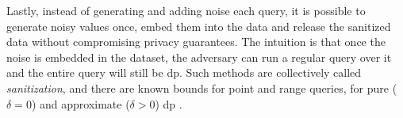 			Lastly, instead of generating and adding noise each query, it is possible to generate noisy values once, embed them into the data and release the sanitized data without compromising privacy guarantees.
			The intuition is that once the noise is embedded in the dataset, the adversary can run a regular query over it and the entire query will still be \acrshort{dp}.
			Such methods are collectively called \emph{sanitization}, and there are known bounds for point and range queries, for pure ($\delta = 0$) and approximate ($\delta > 0$) \acrshort{dp} \cite{bounds-on-sample-complexity,private-learning-and-sanitization,non-interactive-database-privacy,dp-under-observation,dp-release,privately-learning-thresholds}.

		\section{\texorpdfstring{}{Trusted Execution Environments}}
